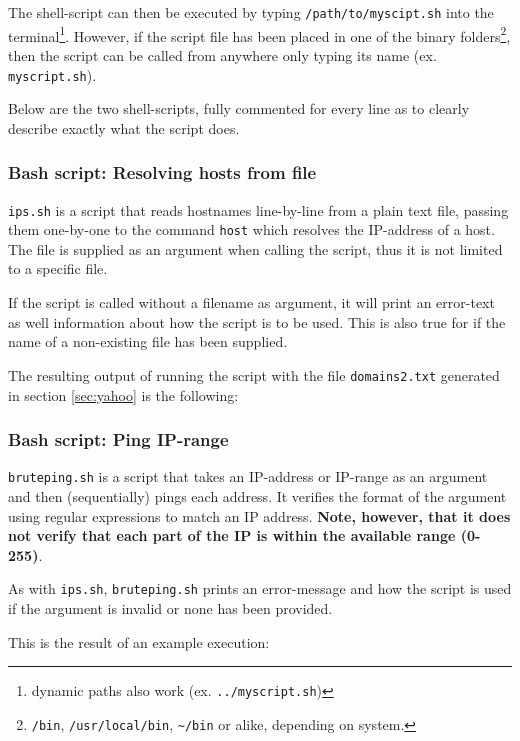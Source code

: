 The shell-script can then be executed by typing \texttt{/path/to/myscipt.sh} into the
terminal\footnote{dynamic paths also work (ex. \texttt{../myscript.sh})}. However, if the script file has been placed in one of the
binary folders\footnote{\texttt{/bin}, \texttt{/usr/local/bin}, \texttt{\textasciitilde/bin}
  or alike, depending on system.}, then the script can be called from anywhere only typing
its name (ex. \texttt{myscript.sh}).

Below are the two shell-scripts, fully commented for every line as to
clearly describe exactly what the script does.

\pagebreak
\subsubsection{Bash script: Resolving hosts from file}
\texttt{ips.sh} is a script that reads hostnames line-by-line from a plain text file,
passing them one-by-one to the command \texttt{host} which resolves the IP-address of
a host. The file is supplied as an argument when calling the script, thus it is not
limited to a specific file.

If the script is called without a filename as argument, it will print an error-text
as well information about how the script is to be used. This is also true for if the name of a
non-existing file has been supplied.



\pagebreak
The resulting output of running the script with the file \texttt{domains2.txt}
generated in section \ref{sec:yahoo} is the following:



\pagebreak
\subsubsection{Bash script: Ping IP-range}
\texttt{bruteping.sh} is a script that takes an IP-address or IP-range as an
argument and then (sequentially) pings each address. It verifies the format of the
argument using regular expressions to match an IP address. \textbf{Note, however,
that it does not verify that each part of the IP is within the available range (0-255)}.

As with \texttt{ips.sh}, \texttt{bruteping.sh} prints an error-message and how the script
is used if the argument is invalid or none has been provided.



This is the result of an example execution:


